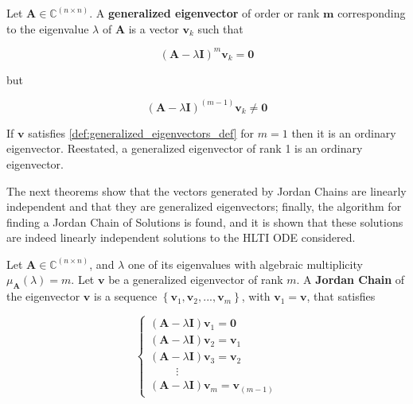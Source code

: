 \begin{definition} \label{def:generalized_eigenvectors} %
	Let $\mathbf{A}\in\mathbb{C}^{\left(n\times n\right)}$. A \textbf{generalized eigenvector} of order or rank $\mathbf{m}$ corresponding to the eigenvalue $\lambda$ of $\mathbf{A}$ is a vector $\mathbf{v}_k$ such that

\begin{equation} \left(\mathbf{A} - \lambda\mathbf{I}\right)^m \mathbf{v}_k = \mathbf{0} \label{def:generalized_eigenvectors_def}\end{equation}

	\noindent but

\begin{equation} \left(\mathbf{A} - \lambda\mathbf{I}\right)^{\left(m-1\right)} \mathbf{v}_k \neq \mathbf{0} \end{equation}
\end{definition} %

\begin{definitionremark} If $\mathbf{v}$ satisfies \eqref{def:generalized_eigenvectors_def} for $m=1$ then it is an ordinary eigenvector. Reestated, a generalized eigenvector of rank 1 is an ordinary eigenvector. \end{definitionremark}

	The next theorems show that the vectors generated by Jordan Chains are linearly independent and that they are generalized eigenvectors; finally, the algorithm for finding a Jordan Chain of Solutions is found, and it is shown that these solutions are indeed linearly independent solutions to the HLTI ODE considered.

\begin{definition} \label{def:jordan_chain} %
	Let $\mathbf{A}\in\mathbb{C}^{\left(n\times n\right)}$, and $\lambda$ one of its eigenvalues with algebraic multiplicity $\mu_\mathbf{A}\left(\lambda\right) = m$. Let $\mathbf{v}$ be a generalized eigenvector of rank $m$. A \textbf{Jordan Chain} of the eigenvector $\mathbf{v}$ is a sequence $\left\{\mathbf{v}_{1},\mathbf{v}_{2},...,\mathbf{v}_{m}\right\}$, with $\mathbf{v}_{1} = \mathbf{v}$, that satisfies

\begin{equation}
\left\{\begin{array}{l}
	\left(\mathbf{A} - \lambda\mathbf{I}\right) \mathbf{v}_{1} = \mathbf{0} \\[3mm]
	\left(\mathbf{A} - \lambda\mathbf{I}\right) \mathbf{v}_{2} = \mathbf{v}_{1} \\[3mm]
	\left(\mathbf{A} - \lambda\mathbf{I}\right) \mathbf{v}_{3} = \mathbf{v}_{2} \\[3mm]
	\hspace{1cm} \vdots \\[3mm]
	\left(\mathbf{A} - \lambda\mathbf{I}\right) \mathbf{v}_{m} = \mathbf{v}_{\left(m-1\right)}
\end{array}\right. \label{eq:def_jordan_chain_seq}
\end{equation}
\end{definition} %

